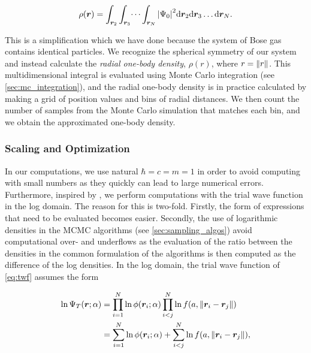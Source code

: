 \begin{equation}\label{eq:one_body_density}
    \rho(\bm{r}) =\int_{\bm{r}_2}\int_{\bm{r}_3}\dots\int_{\bm{r}_{N}}\abs{\Psi_0}^2\mathrm{d}\bm{r}_2\mathrm{d}\bm{r}_3 \dots \mathrm{d}\bm{r}_N. 
\end{equation}

This is a simplification which we have done because the system of Bose gas contains identical particles. We recognize the spherical symmetry of our system and instead calculate the \textit{radial one-body density}, $\rho(r)$, where $r=\norm{r}$. This multidimensional integral is evaluated using Monte Carlo integration (see \autoref{sec:mc_integration}), and the radial one-body density is in practice calculated by making a grid of position values and bins of radial distances. We then count the number of samples from the Monte Carlo simulation that matches each bin, and we obtain the approximated one-body density. 


\subsubsection{Scaling and Optimization}\label{sec:Theory_scaling_and_opt}

In our computations, we use natural $\hbar = c =  m = 1$ in order to avoid computing with small numbers as they quickly can lead to large numerical errors. Furthermore, inspired by \cite{FermiNet}, we perform computations with the trial wave function in the log domain. The reason for this is two-fold. Firstly, the form of expressions that need to be evaluated becomes easier. Secondly, the use of logarithmic densities in the MCMC algorithms (see \autoref{sec:sampling_algos}) avoid computational over- and underflows as the evaluation of the ratio between the densities in the common formulation of the algorithms is then computed as the difference of the log densities. In the log domain, the trial wave function of \autoref{eq:twf} assumes the form

\begin{equation}\label{eq:logwf}
\begin{aligned}
  \ln \Psi_T \qty(\bm{r}; \alpha) &= \prod_{i=1}^N \ln \phi \qty(\bm{r}_i; \alpha)  \prod_{i<j}^N \ln f \qty(a, \norm{\bm{r}_i - \bm{r}_j}) \\ 
  &= \sum_{i=1}^N \ln \phi \qty(\bm{r}_i; \alpha)  + \sum_{i<j}^N \ln f \qty(a, \norm{\bm{r}_i - \bm{r}_j}),
\end{aligned}
\end{equation} 

